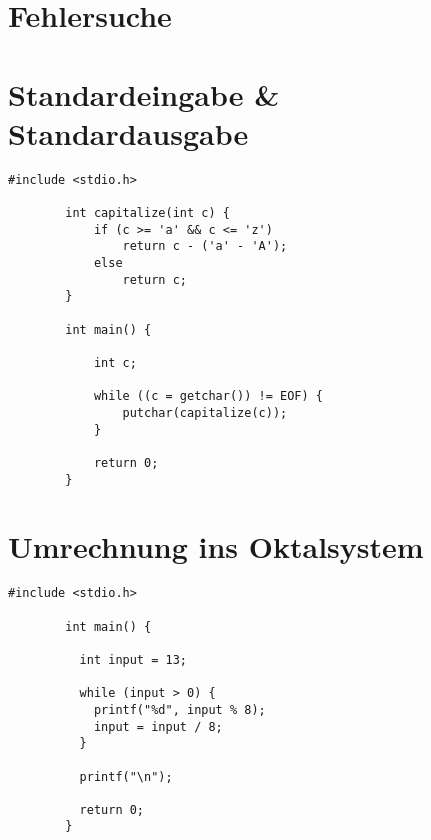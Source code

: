 \documentclass[]{article}
\begin{document}
	\section{Fehlersuche}

	\section{Standardeingabe \& Standardausgabe}
	
	\begin{lstlisting}[gobble=4]
		#include <stdio.h>
		
		int capitalize(int c) {
			if (c >= 'a' && c <= 'z')
				return c - ('a' - 'A');
			else
				return c;
		}
		
		int main() {
			
			int c;
			
			while ((c = getchar()) != EOF) {
				putchar(capitalize(c));
			}
			
			return 0;
		}
	\end{lstlisting}

	\section{Umrechnung ins Oktalsystem}

	\begin{lstlisting}[gobble=4]
		#include <stdio.h>
		
		int main() {
		
		  int input = 13;
		  
		  while (input > 0) {	
		    printf("%d", input % 8);	
		    input = input / 8;	
		  }
		  
		  printf("\n");
		  
		  return 0;  
		}
	\end{lstlisting}
	
\end{document}
